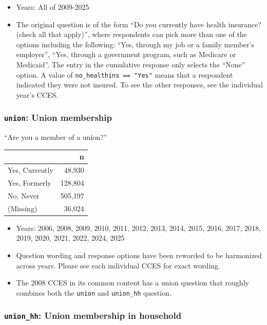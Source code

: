 \documentclass[10pt,article,oneside]{memoir}
\begin{document}
\begin{itemize}
\tightlist
\item
  Years: All of 2009-2025
\item
  The original question is of the form ``Do you currently have health
  insurance? (check all that apply)'', where respondents can pick more
  than one of the options including the following: ``Yes, through my job
  or a family member's employer'', ``Yes, through a government program,
  such as Medicare or Medicaid''. The entry in the cumulative response
  only selects the ``None'' option. A value of
  \texttt{no\_healthins\ ==\ "Yes"} means that a respondent indicated
  they were not insured. To see the other responses, see the individual
  year's CCES.
\end{itemize}

\subsubsection{\texorpdfstring{\texttt{union}: Union
membership}{union: Union membership}}\label{union-union-membership}

``Are you a member of a union?''

\begin{table}[H]
\centering
\begin{tabular}[t]{lr}
\toprule
 & n\\
\midrule
Yes, Currently & 48,930\\
Yes, Formerly & 128,804\\
No, Never & 505,197\\
(Missing) & 36,024\\
\bottomrule
\end{tabular}
\end{table}

\begin{itemize}
\tightlist
\item
  Years: 2006, 2008, 2009, 2010, 2011, 2012, 2013, 2014, 2015, 2016,
  2017, 2018, 2019, 2020, 2021, 2022, 2024, 2025
\item
  Question wording and response options have been reworded to be
  harmonized across years. Please see each individual CCES for exact
  wording.
\item
  The 2008 CCES in its common content has a union question that roughly
  combines both the \texttt{union} and \texttt{union\_hh} question.
\end{itemize}

\subsubsection{\texorpdfstring{\texttt{union\_hh}: Union membership in
household}{union\_hh: Union membership in household}}\label{union_hh-union-membership-in-household}
\end{document}
